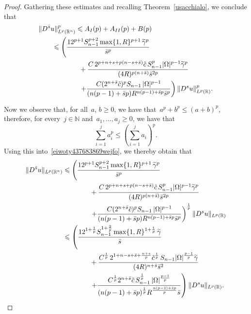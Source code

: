 \documentclass[10pt,a4paper]{amsart}
\newcommand{\N}{\mathbb{N}}
\newcommand{\R}{\mathbb{R}}
\newcommand{\bs}{\Bar{s}}
\renewcommand{\ge}{\geqslant}
\renewcommand{\le}{\leqslant}
\begin{document}
\begin{proof}
Gathering these estimates and recalling
Theorem~\ref{usacchialo}, we conclude that
\begin{equation}\label{eiwoty437683869wejfo}\begin{split}&
\Vert D^{\bs} u \Vert^p_{L^p(\R^n)} \le A_{I}(p) + A_{II}(p) + B(p)\\
&\qquad \le\left(
\frac{12^{p+1} S_{n-1}^{p+2} \max\{1,R\}^{p+1}\,\widetilde\gamma^p}{\bar{s}^p}\right.\\&\qquad\qquad\qquad
+\frac{C\,2^{p+n+s+p(n-s+\bar s)} \Tilde{c}\,S_{n-1}^p|\Omega|^{p-1}\widetilde\gamma^p}{(4R)^{p(n+\bar s)}\bar{s}^{2p}}\\ &\qquad\qquad\qquad \left. 
+\frac{C(2^{n+ \bar{s}} \Tilde{c})^p S_{n-1}\,|\Omega|^{p-1} }{(n(p-1)+ \bar{s}p) R^{n(p-1)+ \bar{s}p}\bar{s}^p} \right) \Vert D^s u \Vert^p_{L^p(\R)}.
\end{split}\end{equation}

Now we observe that, for all~$a$, $b\ge0$, we have that~$a^p+b^p\le(a+b)^p$, therefore,
for every~$j\in\N$ and~$a_1,\dots, a_j\ge0$, we have that
$$ \sum_{i=1}^j a_i^p\le \left( \sum_{i=1}^j a_i\right)^p.$$
Using this into~\eqref{eiwoty437683869wejfo}, we thereby obtain that
\begin{equation}\label{dewiosdvjt473kipipoiupuoy}\begin{split}
\Vert D^{\bs} u \Vert_{L^p(\R^n)}& \le\left(
\frac{12^{p+1} S_{n-1}^{p+2} \max\{1,R\}^{p+1}\,\widetilde\gamma^p}{\bar{s}^p}\right.\\ &\qquad \qquad
+\frac{C\,2^{p+n+s+p(n-s+\bar s)} \Tilde{c}\,S_{n-1}^p|\Omega|^{p-1}\widetilde\gamma^p}{(4R)^{p(n+\bar s)}\bar{s}^{2p}}\\ &\qquad\qquad \left. 
+\frac{C(2^{n+ \bar{s}} \Tilde{c})^p S_{n-1}\,|\Omega|^{p-1} }{(n(p-1)+ \bar{s}p) R^{n(p-1)+ \bar{s}p}\bar{s}^p} \right)^{\frac1p} \Vert D^s u \Vert_{L^p(\R)}\\
&\le\left(
\frac{12^{1+\frac1p} S_{n-1}^{1+\frac2p} \max\{1,R\}^{1+\frac1p}\,\widetilde\gamma}{\bar{s}}\right.\\ &\qquad \qquad
+\frac{C^{\frac1p}\,2^{1+n-s+\bar s+\frac{n+s}p} \Tilde{c}^{\frac1p}\,S_{n-1}|\Omega|^{\frac{p-1}p}\widetilde\gamma}{(4R)^{n+\bar s}\bar{s}^{2}}\\ &\qquad \qquad \left. 
+\frac{C^{\frac1p} 2^{n+ \bar{s}} \Tilde{c}\, S_{n-1}^{\frac1p}\,|\Omega|^{\frac{p-1}p} }{(n(p-1)+ \bar{s}p)^{\frac1p} R^{\frac{n(p-1)+ \bar{s}p}p}\bar{s}} \right) \Vert D^s u \Vert_{L^p(\R)}
.\end{split}\end{equation}


\end{proof}
\end{document}
